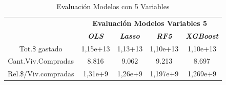 \documentclass[conference, 10pt]{IEEEtran}
\begin{document}
\begin{table}[htbp]
\caption{Evaluación Modelos con 5 Variables}
\begin{center}
\begin{tabular}{|c|c|c|c|c|}
\hline
&\multicolumn{4}{|c|}{\textbf{Evaluación Modelos Variables 5}} \\
\cline{2-5} 
& \textbf{\textit{OLS}}& \textbf{\textit{Lasso}}& \textbf{\textit{RF5}}& \textbf{\textit{XGBoost}} \\
\hline
Tot.\$ gastado& 1,15e+13& 1,13+13& 1,10e+13& 1,10e+13 \\
\hline
Cant.Viv.Compradas& 8.816& 9.062& 9.213& 8.697 \\
\hline
Rel.\$/Viv.compradas& 1,31e+9& 1,26e+9& 1,197e+9& 1,269e+9 \\

\hline
\end{tabular}
\label{tab_13}
\end{center}
\end{table}
\end{document}
